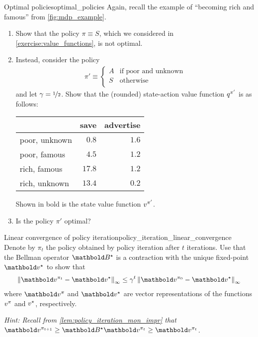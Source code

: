 \begin{nexercise}{Optimal policies}{optimal_policies}
  Again, recall the example of ``becoming rich and famous'' from \cref{fig:mdp_example}.

  \begin{enumerate}
    \item Show that the policy $\pi \equiv S$, which we considered in \cref{exercise:value_functions}, is not optimal.
    \item Instead, consider the policy \begin{align*}
      \pi' \equiv \begin{cases}
        A & \text{if poor and unknown} \\
        S & \text{otherwise} \\
      \end{cases}
    \end{align*} and let $\gamma = \nicefrac{1}{2}$. Show that the (rounded) state-action value function $\fnq[\pi']$ is as follows:

    \vspace{5pt}
    \begin{center}
      \begin{tabular}{lrr}
        \toprule
        & save & advertise \\
        \midrule
        poor, unknown & $0.8$ & $\mathbf{1.6}$ \\
        poor, famous & $\mathbf{4.5}$ & $1.2$ \\
        rich, famous & $\mathbf{17.8}$ & $1.2$ \\
        rich, unknown & $\mathbf{13.4}$ & $0.2$ \\
        \bottomrule
      \end{tabular}
    \end{center}
    \vspace{5pt}

    Shown in bold is the state value function $\fnv[\pi']$.
    \item Is the policy $\pi'$ optimal?
  \end{enumerate}
\end{nexercise}

\begin{nexercise}{Linear convergence of policy iteration}{policy_iteration_linear_convergence}
  Denote by $\pi_t$ the policy obtained by policy iteration after $t$ iterations.
  Use that the Bellman operator $\mBs$ is a contraction with the unique fixed-point $\vvs$ to show that \begin{align}
    \norm{\vv^{\pi_t} - \vvs}_\infty \leq \gamma^t \norm{\vv^{\pi_0} - \vvs}_\infty
  \end{align} where $\vv^{\pi}$ and $\vvs$ are vector representations of the functions $\fnv[\pi]$ and $\fnv[\star]$, respectively.

  \textit{Hint: Recall from \cref{lem:policy_iteration_mon_impr} that $\vv^{\pi_{t+1}} \geq \mBs\vv^{\pi_t} \geq \vv^{\pi_t}$.}
\end{nexercise}

